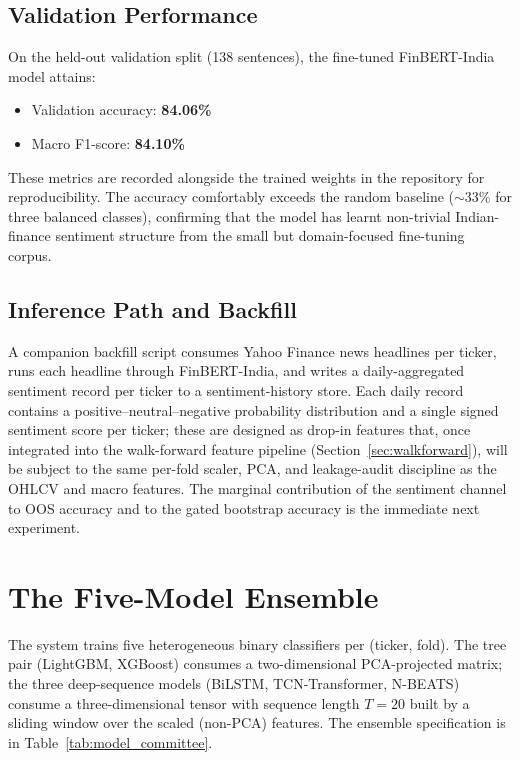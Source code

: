 \subsection{Validation Performance}

On the held-out validation split (138 sentences), the fine-tuned FinBERT-India model attains:
\begin{itemize}\itemsep1pt
    \item Validation accuracy: \textbf{84.06\%}
    \item Macro F1-score: \textbf{84.10\%}
\end{itemize}

These metrics are recorded alongside the trained weights in the repository for reproducibility. The accuracy comfortably exceeds the random baseline ($\sim 33\%$ for three balanced classes), confirming that the model has learnt non-trivial Indian-finance sentiment structure from the small but domain-focused fine-tuning corpus.

\subsection{Inference Path and Backfill}

A companion backfill script consumes Yahoo Finance news headlines per ticker, runs each headline through FinBERT-India, and writes a daily-aggregated sentiment record per ticker to a sentiment-history store. Each daily record contains a positive--neutral--negative probability distribution and a single signed sentiment score per ticker; these are designed as drop-in features that, once integrated into the walk-forward feature pipeline (Section~\ref{sec:walkforward}), will be subject to the same per-fold scaler, PCA, and leakage-audit discipline as the OHLCV and macro features. The marginal contribution of the sentiment channel to OOS accuracy and to the gated bootstrap accuracy is the immediate next experiment.

\section{The Five-Model Ensemble}

The system trains five heterogeneous binary classifiers per (ticker, fold). The tree pair (LightGBM, XGBoost) consumes a two-dimensional PCA-projected matrix; the three deep-sequence models (BiLSTM, TCN-Transformer, N-BEATS) consume a three-dimensional tensor with sequence length $T=20$ built by a sliding window over the scaled (non-PCA) features. The ensemble specification is in Table~\ref{tab:model_committee}.

